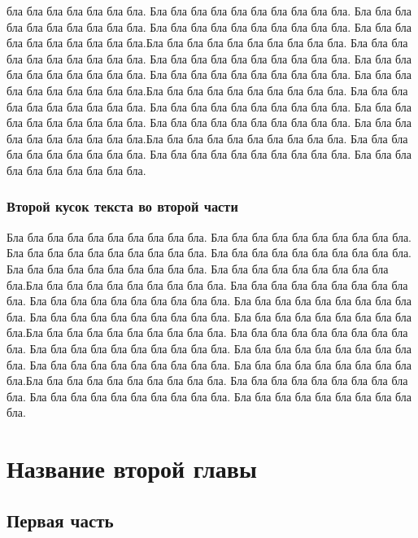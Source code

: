 \documentclass[12pt, a4paper]{article}
\begin{document}
бла бла бла бла бла бла бла. Бла бла бла бла бла бла бла бла бла бла. Бла бла бла бла бла бла бла бла бла бла. Бла бла бла бла бла бла бла бла бла бла. Бла бла бла бла бла бла бла бла бла бла.Бла бла бла бла бла бла бла бла бла бла. Бла бла бла бла бла бла бла бла бла бла. Бла бла бла бла бла бла бла бла бла бла. Бла бла бла бла бла бла бла бла бла бла. Бла бла бла бла бла бла бла бла бла бла. Бла бла бла бла бла бла бла бла бла бла.Бла бла бла бла бла бла бла бла бла бла. Бла бла бла бла бла бла бла бла бла бла. Бла бла бла бла бла бла бла бла бла бла. Бла бла бла бла бла бла бла бла бла бла. Бла бла бла бла бла бла бла бла бла бла. Бла бла бла бла бла бла бла бла бла бла.Бла бла бла бла бла бла бла бла бла бла. Бла бла бла бла бла бла бла бла бла бла. Бла бла бла бла бла бла бла бла бла бла. Бла бла бла бла бла бла бла бла бла бла.

\subsection{Второй кусок текста во второй части}
Бла бла бла бла бла бла бла бла бла бла. Бла бла бла бла бла бла бла бла бла бла. Бла бла бла бла бла бла бла бла бла бла. Бла бла бла бла бла бла бла бла бла бла. Бла бла бла бла бла бла бла бла бла бла. Бла бла бла бла бла бла бла бла бла бла.Бла бла бла бла бла бла бла бла бла бла. Бла бла бла бла бла бла бла бла бла бла. Бла бла бла бла бла бла бла бла бла бла. Бла бла бла бла бла бла бла бла бла бла. Бла бла бла бла бла бла бла бла бла бла. Бла бла бла бла бла бла бла бла бла бла.Бла бла бла бла бла бла бла бла бла бла. Бла бла бла бла бла бла бла бла бла бла. Бла бла бла бла бла бла бла бла бла бла. Бла бла бла бла бла бла бла бла бла бла. Бла бла бла бла бла бла бла бла бла бла. Бла бла бла бла бла бла бла бла бла бла.Бла бла бла бла бла бла бла бла бла бла. Бла бла бла бла бла бла бла бла бла бла. Бла бла бла бла бла бла бла бла бла бла. Бла бла бла бла бла бла бла бла бла бла.



\chapter{Название второй главы}

\section{Первая часть}
\end{document}
